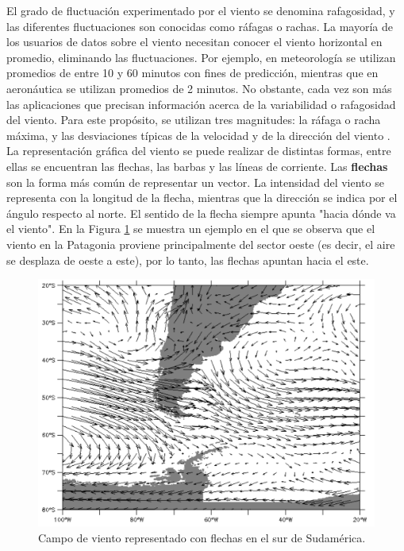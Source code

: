 El grado de fluctuación experimentado por el viento se denomina  rafagosidad, y las diferentes fluctuaciones son conocidas como ráfagas o rachas. La mayoría de los usuarios de datos sobre el viento necesitan conocer el viento horizontal en promedio, eliminando las fluctuaciones. Por ejemplo, en meteorología se utilizan promedios de entre 10 y 60 minutos con fines de predicción, mientras que en aeronáutica se utilizan promedios de 2 minutos. No obstante, cada vez son más las aplicaciones que precisan información acerca de la variabilidad o rafagosidad del viento. Para este propósito, se utilizan tres magnitudes: la ráfaga o racha máxima, y las desviaciones típicas de la velocidad y de la dirección del viento \cite{wmoChapter8}. La representación gráfica del viento se puede realizar de distintas formas, entre ellas se encuentran las flechas, las barbas y las líneas de corriente. Las \textbf{flechas} \cite{CursoDeObsevadores} son la forma más común de representar un vector. La intensidad del viento se representa con la longitud de la flecha, mientras que la dirección se indica por el ángulo respecto al norte. El sentido de la flecha siempre apunta "hacia dónde va el viento". En la Figura \ref{fig:mapaFlechas} se muestra un ejemplo en el que se observa que el viento en la Patagonia proviene principalmente del sector oeste (es decir, el aire se desplaza de oeste a este), por lo tanto, las flechas apuntan hacia el este.

\begin{figure}[H]
    \centering
    \includegraphics[width=0.85\linewidth]{Figuras/viento/mapaFlechas.png}
    \caption{Campo de viento representado con flechas en el sur de Sudamérica. \cite{cursoObservadores2024}}
    \label{fig:mapaFlechas}
\end{figure}

